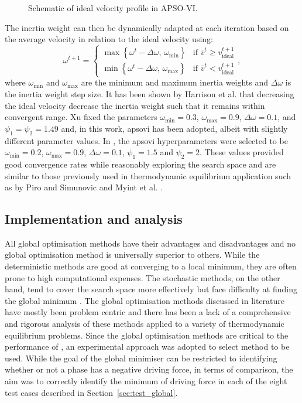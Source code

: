 \begin{enumerate}
\begin{figure}[htbp]
				\caption{Schematic of ideal velocity profile in APSO-VI.}
				\label{fig:APSO-ideal_v}
			\end{figure}
			The inertia weight can then be dynamically adapted at each iteration based on the average velocity in relation to the ideal velocity \cite{Harrison:2018aa} using:
			\begin{equation}
				\omega^{t+1} =  \begin{cases}
								\max \left\{ \omega^t - \Delta \omega, \, \omega_\text{min}\right\}& \text{if } \bar{v}^t \geq  {v}_\text{ideal}^{t+1}\\
								\min \left\{ \omega^t - \Delta \omega, \, \omega_\text{max}\right\}& \text{if } \bar{v}^t <  {v}_\text{ideal}^{t+1}
							\end{cases},
			\end{equation}
			where $\omega_\text{min}$ and $\omega_\text{max}$ are the minimum and maximum inertia weights and $\Delta \omega$ is the inertia weight step size. It has been shown by Harrison et al. \cite{Harrison:2016aa} that decreasing the ideal velocity decrease the inertia weight such that it remains within convergent range. Xu fixed the parameters $\omega_\text{min} = 0.3$, $\omega_\text{max} = 0.9$, $\Delta \omega = 0.1$, and $\psi_1 = \psi_2 = 1.49$ \cite{Xu:2013aa} and, in this work, \gls{apsovi} has been adopted, albeit with slightly different parameter values. In {\GEM}, the \gls{apsovi} hyperparameters were selected to be $\omega_\text{min} = 0.2$, $\omega_\text{max} = 0.9$, $\Delta \omega = 0.1$, $\psi_1 = 1.5$ and  $\psi_2 = 2$. These values provided good convergence rates while reasonably exploring the search space and are similar to those previously used in thermodynamic equilibrium application such as by Piro and Simunovic \cite{Piro16} and Myint et al. \cite{Myint:2021aa}.
	\end{enumerate}

	
	\subsection{Implementation and analysis}
	All global optimisation methods have their advantages and disadvantages and no global optimisation method is universally superior to others. While the deterministic methods are good at converging to a local minimum, they are often prone to high computational expenses. The stochastic methods, on the other hand, tend to cover the search space more effectively but face difficulty at finding the global minimum \cite{Piro16}. The global optimisation methods discussed in literature have mostly been problem centric and there has been a lack of a comprehensive and rigorous analysis of these methods applied to a variety of thermodynamic equilibrium problems. 	Since the global optimisation methods are critical to the performance of {\GEM}, an experimental approach was adopted to select method to be used. While the goal of the global minimiser can be restricted to identifying whether or not a phase has a negative driving force, in terms of comparison, the aim was to correctly identify the minimum of driving force in each of the eight test cases described in Section~\ref{sec:test_global}.  
	
